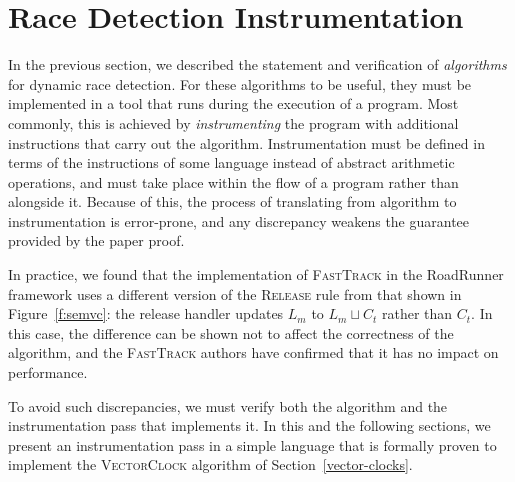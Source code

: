 \documentclass[preprint, 9pt]{sigplanconf}
\newcommand{\VCalg}{\textsc{VectorClock}\xspace}
\newcommand{\FT}{\textsc{FastTrack}\xspace}
\newcommand{\Rule}[1]{\textsc{#1}}
\begin{document}
\section{Race Detection Instrumentation}
\label{language}

In the previous section, we described the statement and verification of \emph{algorithms} for dynamic race detection. For these algorithms to be useful, they must be implemented in a tool that runs during the execution of a program. Most commonly, this is achieved by \emph{instrumenting} the program with additional instructions that carry out the algorithm. Instrumentation must be defined in terms of the instructions of some language instead of abstract arithmetic operations, and must take place within the flow of a program rather than alongside it. Because of this, the process of translating from algorithm to instrumentation is error-prone, and any discrepancy weakens the guarantee provided by the paper proof.

In practice, we found that the implementation of \FT in the RoadRunner framework uses a different version of the \Rule{Release} rule from that shown in Figure~\ref{f:semvc}: the release handler updates $L_m$ to $L_m \sqcup C_t$ rather than $C_t$. In this case, the difference can be shown not to affect the correctness of the algorithm, and the \FT authors have confirmed that it has no impact on performance. 

To avoid such discrepancies, we must verify both the algorithm and the instrumentation pass that implements it. In this and the following sections, we present an instrumentation pass in a simple language that is formally proven to implement the \VCalg algorithm of Section~\ref{vector-clocks}.
\end{document}
